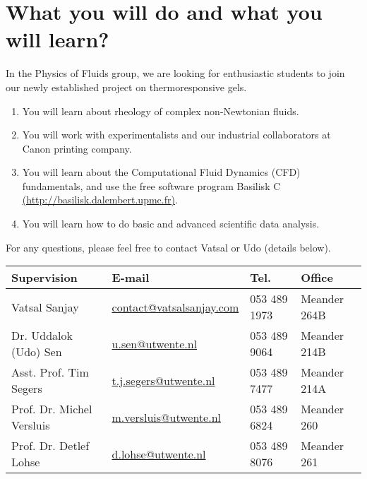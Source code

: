 \documentclass[a4paper,10pt]{article}
\begin{document}
\section*{What you will do and what you will learn?}
In the Physics of Fluids group, we are looking for enthusiastic students to join our newly established project on thermoresponsive gels. 
\begin{enumerate}
	\item You will learn about rheology of complex non-Newtonian fluids. 
	\item You will work with experimentalists and our industrial collaborators at Canon printing company.
	\item You will learn about the Computational Fluid Dynamics (CFD) fundamentals, and use the free software program Basilisk C \href{http://basilisk.dalembert.upmc.fr}{(http://basilisk.dalembert.upmc.fr)}. 
	\item You will learn how to do basic and advanced scientific data analysis. 
\end{enumerate}
For any questions, please feel free to contact Vatsal or Udo (details below). 

\begin{center}
\begin{tabular}{|l|l|l|l|}
\hline \textbf{Supervision} & \textbf{E-mail} & \textbf{Tel.} & \textbf{Office} \\ 
\hline Vatsal Sanjay & \href{mailto:contact@vatsalsanjay.com}{contact@vatsalsanjay.com} & 053 489 1973 & Meander 264B \\ 
\hline Dr. Uddalok (Udo) Sen & \href{mailto:u.sen@utwente.nl}{u.sen@utwente.nl} & 053 489 9064 & Meander 214B \\ 
\hline Asst. Prof. Tim Segers & \href{mailto:t.j.segers@utwente.nl}{t.j.segers@utwente.nl} & 053 489 7477 & Meander 214A \\ 
\hline Prof. Dr. Michel Versluis & \href{mailto:m.versluis@utwente.nl}{m.versluis@utwente.nl} & 053 489 6824 & Meander 260 \\ 
\hline Prof. Dr. Detlef Lohse & \href{mailto:d.lohse@utwente.nl}{d.lohse@utwente.nl} & 053 489 8076 & Meander 261 \\ 
\hline 
\end{tabular} 
\end{center}
\end{document}
